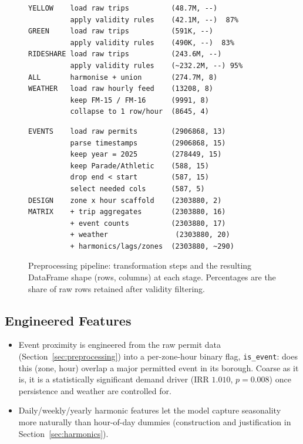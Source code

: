 \documentclass[11pt]{article}
\begin{document}
\begin{figure}[htbp]
\centering
\begin{minipage}[t]{0.48\linewidth}
\fontsize{7.5}{8.3}\selectfont\ttfamily
\begin{verbatim}
YELLOW    load raw trips          (48.7M, --)
          apply validity rules    (42.1M, --)  87%
GREEN     load raw trips          (591K, --)
          apply validity rules    (490K, --)  83%
RIDESHARE load raw trips          (243.6M, --)
          apply validity rules    (~232.2M, --) 95%
ALL       harmonise + union       (274.7M, 8)
WEATHER   load raw hourly feed    (13208, 8)
          keep FM-15 / FM-16      (9991, 8)
          collapse to 1 row/hour  (8645, 4)
\end{verbatim}
\end{minipage}
\hfill
\begin{minipage}[t]{0.48\linewidth}
\fontsize{7.5}{8.3}\selectfont\ttfamily
\begin{verbatim}
EVENTS    load raw permits        (2906868, 13)
          parse timestamps        (2906868, 15)
          keep year = 2025        (278449, 15)
          keep Parade/Athletic    (588, 15)
          drop end < start        (587, 15)
          select needed cols      (587, 5)
DESIGN    zone x hour scaffold    (2303880, 2)
MATRIX    + trip aggregates       (2303880, 16)
          + event counts          (2303880, 17)
          + weather                (2303880, 20)
          + harmonics/lags/zones  (2303880, ~290)
\end{verbatim}
\end{minipage}
\caption{Preprocessing pipeline: transformation steps and the resulting DataFrame shape (rows, columns) at each stage. Percentages are the share of raw rows retained after validity filtering.}
\label{fig:pipeline_shapes}
\end{figure}

\subsection{Engineered Features}

\begin{itemize}
    \item[$\star$] Event proximity is engineered from the raw permit data (Section~\ref{sec:preprocessing}) into a per-zone-hour binary flag, \texttt{is\_event}: does this (zone, hour) overlap a major permitted event in its borough. Coarse as it is, it is a statistically significant demand driver (IRR $1.010$, $p=0.008$) once persistence and weather are controlled for.
    \item[$\star$] Daily/weekly/yearly harmonic features let the model capture seasonality more naturally than hour-of-day dummies (construction and
          justification in Section~\ref{sec:harmonics}).
\end{itemize}
\end{document}
